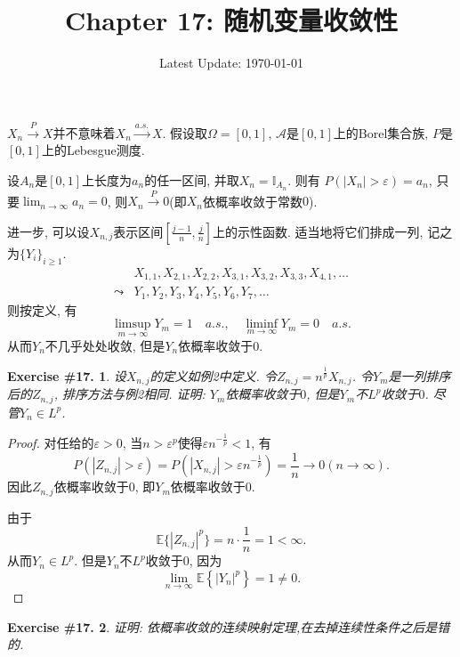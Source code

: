 \documentclass[UTF8, a4paper]{article}
\title{Chapter 17: 随机变量收敛性}
\author{}
\date{Latest Update: \today}
\newtheorem{exercise}{Exercise \#17.}
\begin{document}
\maketitle


\begin{framed}
\(X_n \xrightarrow{P}X\)并不意味着\(X_n \xrightarrow{a.s.} X\).
假设取\(\Omega = [0, 1]\), \(\mathcal{A}\)是\([0, 1]\)上的Borel集合族, \({P}\)是\([0, 1]\)上的Lebesgue测度.

设\(A_n\)是\([0,1]\)上长度为\(a_n\)的任一区间, 并取\(X_n = \mathbb{I}_{A_n}\). 则有 
\(P(|X_n| > \varepsilon) = a_n\), 只要\(\lim_{n\to\infty} a_n = 0\), 则\(X_n \xrightarrow{P} 0\)(即\(X_n\)依概率收敛于常数\(0\)).

进一步, 可以设\(X_{n,j}\)表示区间\(\left[\frac{j-1}{n}, \frac{j}{n}\right]\)上的示性函数. 适当地将它们排成一列, 记之为\(\{Y_i\}_{i \geq 1}\).
$$
\begin{aligned}
& X_{1,1}, X_{2,1}, X_{2,2}, X_{3,1}, X_{3,2}, X_{3,3}, X_{4,1}, \ldots \\
\leadsto & Y_1, Y_2, Y_3, Y_4, Y_5, Y_6, Y_7, \ldots
\end{aligned}
$$
则按定义, 有
$$
\limsup_{m\to \infty} Y_m = 1 \quad a.s., \quad \liminf_{m\to \infty} Y_m = 0 \quad a.s.
$$
从而\(Y_n\)不几乎处处收敛, 但是\(Y_n\)依概率收敛于\(0\).
\end{framed}


\begin{framed}
\begin{exercise}
设\(X_{n,j}\)的定义如例2中定义. 
令\(Z_{n, j} = n^{\frac{1}{p}}X_{n,j}\).
令\(Y_m\)是一列排序后的\(Z_{n,j}\), 排序方法与例2相同. 证明:
\(Y_m\)依概率收敛于\(0\), 但是\(Y_m\)不\(L^p\)收敛于\(0\).
尽管\(Y_n \in L^p\).
\end{exercise}
\end{framed}

\begin{proof}
对任给的\(\varepsilon > 0\), 当\(n > \varepsilon^p\)使得\(\varepsilon n^{-\frac{1}{p}} < 1\), 有
$$
P(|Z_{n,j}| > \varepsilon) = P(|X_{n,j}| > \varepsilon n^{-\frac{1}{p}}) = \frac{1}{n}\to 0 (n \to \infty).
$$
因此\(Z_{n,j}\)依概率收敛于\(0\), 即\(Y_m\)依概率收敛于\(0\).

由于 
$$
\mathbb{E}\{|Z_{n,j}|^p\} = n \cdot \frac{1}{n} =1 < \infty.
$$
从而\(Y_n \in L^p\). 但是\(Y_n\)不\(L^p\)收敛于\(0\), 因为
$$
\lim _{n \rightarrow \infty} \mathbb{E}\left\{\left|Y_n\right|^p\right\}=1 \neq 0 .
$$
\end{proof}


\begin{framed}
\begin{exercise}
证明: 依概率收敛的连续映射定理,在去掉连续性条件之后是错的.
\end{exercise}
\end{framed}
\end{document}

